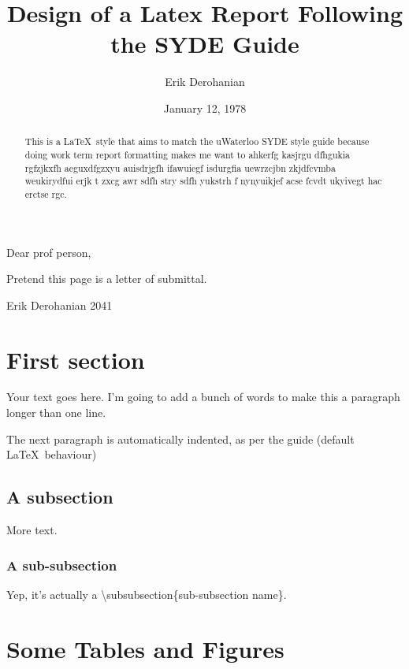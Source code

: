 \documentclass[twoside, 12pt]{article}
\title{Design of a Latex Report Following the SYDE Guide}
\author{Erik Derohanian}
\date{January 12, 1978}
\begin{document}
	
	\makewtrtitle

	Dear prof person,

	Pretend this page is a letter of submittal.

	Erik Derohanian
	2041

	\newpage

	\begin{abstract}
		This is a \LaTeX\ style that aims to match the uWaterloo SYDE style guide because doing work term report formatting makes me want to ahkerfg kasjrgu dfhgukia rgfzjkxfh aeguxdfgzxyu auisdrjgfh ifawuiegf isdurgfia uewrzcjbn zkjdfcvmba weukirydfui erjk t  zxcg awr sdfh stry sdfh yukstrh f nynyuikjef acse fcvdt ukyivegt hac erctse rgc.
	\end{abstract}

	\tableofcontents
	\newpage

	\listoffigures
	\newpage
	\listoftables
	\newpage

	\startarabicpagenumbers

	\section{First section}

	Your text goes here. I'm going to add a bunch of words to make this a paragraph longer than one line.

	The next paragraph is automatically indented, as per the guide (default \LaTeX\ behaviour)

	\subsection{A subsection}

	More text.

	\subsubsection{A sub-subsection}

	Yep, it's actually a \textbackslash subsubsection\{sub-subsection name\}.

	\section{Some Tables and Figures}
\end{document}
